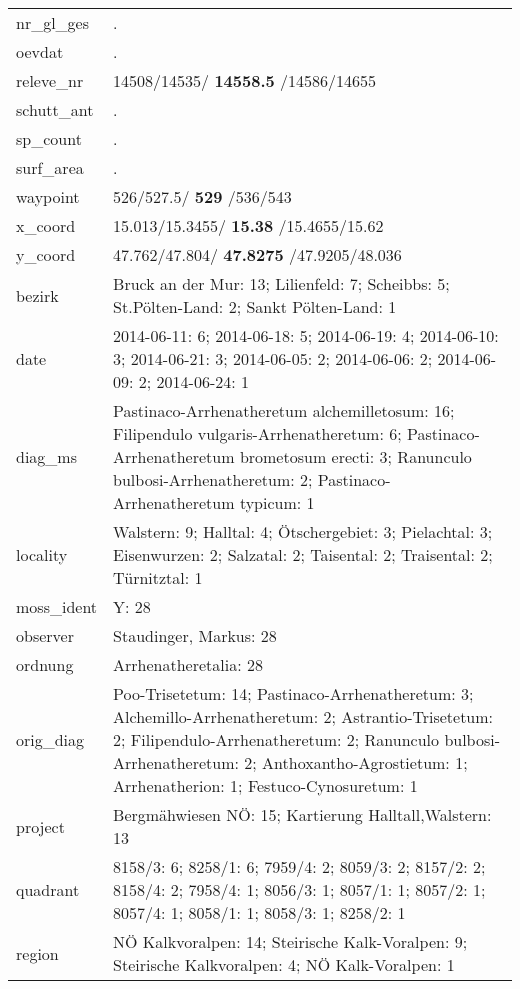 \documentclass[9pt]{article}
\begin{document}
\begin{longtable}{lllllllllllllll}
nr_gl_ges& \multicolumn{14}{p{150mm}}{.}\tabularnewline
oevdat& \multicolumn{14}{p{150mm}}{.}\tabularnewline
releve_nr& \multicolumn{14}{p{150mm}}{14508/14535/\textbf{ 14558.5 }/14586/14655}\tabularnewline
schutt_ant& \multicolumn{14}{p{150mm}}{.}\tabularnewline
sp_count& \multicolumn{14}{p{150mm}}{.}\tabularnewline
surf_area& \multicolumn{14}{p{150mm}}{.}\tabularnewline
waypoint& \multicolumn{14}{p{150mm}}{526/527.5/\textbf{ 529 }/536/543}\tabularnewline
x_coord& \multicolumn{14}{p{150mm}}{15.013/15.3455/\textbf{ 15.38 }/15.4655/15.62}\tabularnewline
y_coord& \multicolumn{14}{p{150mm}}{47.762/47.804/\textbf{ 47.8275 }/47.9205/48.036}\tabularnewline
bezirk& \multicolumn{14}{p{150mm}}{Bruck an der Mur: 13; Lilienfeld: 7; Scheibbs: 5; St.Pölten-Land: 2; Sankt Pölten-Land: 1}\tabularnewline
date& \multicolumn{14}{p{150mm}}{2014-06-11: 6; 2014-06-18: 5; 2014-06-19: 4; 2014-06-10: 3; 2014-06-21: 3; 2014-06-05: 2; 2014-06-06: 2; 2014-06-09: 2; 2014-06-24: 1}\tabularnewline
diag_ms& \multicolumn{14}{p{150mm}}{Pastinaco-Arrhenatheretum alchemilletosum: 16; Filipendulo vulgaris-Arrhenatheretum: 6; Pastinaco-Arrhenatheretum brometosum erecti: 3; Ranunculo bulbosi-Arrhenatheretum: 2; Pastinaco-Arrhenatheretum typicum: 1}\tabularnewline
locality& \multicolumn{14}{p{150mm}}{Walstern: 9; Halltal: 4; Ötschergebiet: 3; Pielachtal: 3; Eisenwurzen: 2; Salzatal: 2; Taisental: 2; Traisental: 2; Türnitztal: 1}\tabularnewline
moss_ident& \multicolumn{14}{p{150mm}}{Y: 28}\tabularnewline
observer& \multicolumn{14}{p{150mm}}{Staudinger, Markus: 28}\tabularnewline
ordnung& \multicolumn{14}{p{150mm}}{Arrhenatheretalia: 28}\tabularnewline
orig_diag& \multicolumn{14}{p{150mm}}{Poo-Trisetetum: 14; Pastinaco-Arrhenatheretum: 3; Alchemillo-Arrhenatheretum: 2; Astrantio-Trisetetum: 2; Filipendulo-Arrhenatheretum: 2; Ranunculo bulbosi-Arrhenatheretum: 2; Anthoxantho-Agrostietum: 1; Arrhenatherion: 1; Festuco-Cynosuretum: 1}\tabularnewline
project& \multicolumn{14}{p{150mm}}{Bergmähwiesen NÖ: 15; Kartierung Halltall,Walstern: 13}\tabularnewline
quadrant& \multicolumn{14}{p{150mm}}{8158/3: 6; 8258/1: 6; 7959/4: 2; 8059/3: 2; 8157/2: 2; 8158/4: 2; 7958/4: 1; 8056/3: 1; 8057/1: 1; 8057/2: 1; 8057/4: 1; 8058/1: 1; 8058/3: 1; 8258/2: 1}\tabularnewline
region& \multicolumn{14}{p{150mm}}{NÖ Kalkvoralpen: 14; Steirische Kalk-Voralpen: 9; Steirische Kalkvoralpen: 4; NÖ Kalk-Voralpen: 1}\tabularnewline

\end{longtable}
\end{document}
